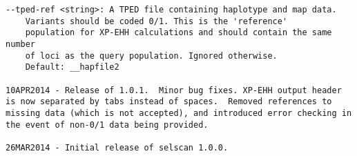 \documentclass[12pt]{article}%
\begin{document}
\begin{lstlisting}
--tped-ref <string>: A TPED file containing haplotype and map data.
	Variants should be coded 0/1. This is the 'reference'
	population for XP-EHH calculations and should contain the same number
	of loci as the query population. Ignored otherwise.
	Default: __hapfile2

10APR2014 - Release of 1.0.1.  Minor bug fixes. XP-EHH output header is now separated by tabs instead of spaces.  Removed references to missing data (which is not accepted), and introduced error checking in the event of non-0/1 data being provided.

26MAR2014 - Initial release of selscan 1.0.0.
\end{lstlisting}


\end{document}
